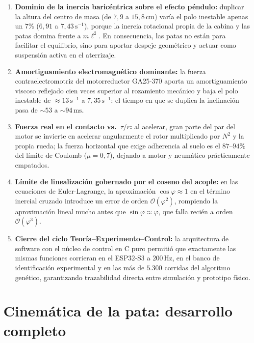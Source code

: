 \documentclass[11pt,a4paper]{report}
\newcommand{\ud}[1]{\,\mathrm{#1}}
\begin{document}
\begin{enumerate}[leftmargin=1.6em]
\item \textbf{Dominio de la inercia baricéntrica sobre el efecto péndulo:} duplicar la altura del
      centro de masa (de $7{,}9$ a $15{,}8\ud{cm}$) varía el polo inestable apenas un $7\%$
      ($6{,}91$ a $7{,}43\ud{s^{-1}}$), porque la inercia rotacional propia de la cabina y las
      patas domina frente a $m\ell^2$. En consecuencia, las patas no están para facilitar el
      equilibrio, sino para aportar despeje geométrico y actuar como suspensión activa en el
      aterrizaje.
\item \textbf{Amortiguamiento electromagnético dominante:} la fuerza contraelectromotriz del
      motorreductor GA25-370 aporta un amortiguamiento viscoso reflejado cien veces superior al
      rozamiento mecánico y baja el polo inestable de $\approx 13\ud{s^{-1}}$ a
      $7{,}35\ud{s^{-1}}$: el tiempo en que se duplica la inclinación pasa de $\sim 53$ a
      $\sim 94\ud{ms}$.
\item \textbf{Fuerza real en el contacto vs.\ $\tau/r$:} al acelerar, gran parte del par del
      motor se invierte en acelerar angularmente el rotor multiplicado por $N^2$ y la propia
      rueda; la fuerza horizontal que exige adherencia al suelo es el $87\text{--}94\%$ del
      límite de Coulomb ($\mu = 0{,}7$), dejando a motor y neumático prácticamente empatados.
\item \textbf{Límite de linealización gobernado por el coseno del acople:} en las ecuaciones de
      Euler-Lagrange, la aproximación $\cos\varphi \approx 1$ en el término inercial cruzado
      introduce un error de orden $\mathcal{O}(\varphi^2)$, rompiendo la aproximación lineal
      mucho antes que $\sin\varphi \approx \varphi$, que falla recién a orden $\mathcal{O}(\varphi^3)$.
\item \textbf{Cierre del ciclo Teoría--Experimento--Control:} la arquitectura de software con el
      núcleo de control en C puro permitió que exactamente las mismas funciones corrieran en el
      ESP32-S3 a $200\ud{Hz}$, en el banco de identificación experimental y en las más de $5.300$
      corridas del algoritmo genético, garantizando trazabilidad directa entre simulación y
      prototipo físico.
\end{enumerate}

\appendix
\chapter{Cinemática de la pata: desarrollo completo}\label{ap:cin}

\end{document}

